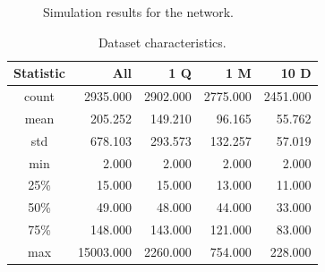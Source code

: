 \documentclass[conference,compsoc]{IEEEtran}
\begin{document}
\begin{figure}[!t]
\centering
{}
\hfil
{}
\caption{Simulation results for the network.}
\label{fig_sim2}
\end{figure}

\begin{table}[!t]
	\renewcommand{\arraystretch}{1.3}
	\caption{Dataset characteristics. }
	\label{dataset_description}
	\centering
	\begin{tabular}{c|r|r|r|r}
		Statistic &        All  & 1 Q & 1 M & 10 D \\
		\hline
		count &  2935.000  &     2902.000  &   2775.000 &   2451.000 \\
		mean  &   205.252  &      149.210  &     96.165 &     55.762 \\
		std   &   678.103  &      293.573  &    132.257 &     57.019 \\
		min   &     2.000  &        2.000  &      2.000 &      2.000 \\
		25\%   &    15.000  &       15.000  &     13.000 &     11.000 \\
		50\%   &    49.000  &       48.000  &     44.000 &     33.000 \\
		75\%   &   148.000  &      143.000  &    121.000 &     83.000 \\
		max   & 15003.000  &     2260.000  &    754.000 &    228.000 \\

	\end{tabular}
\end{table}
\end{document}
